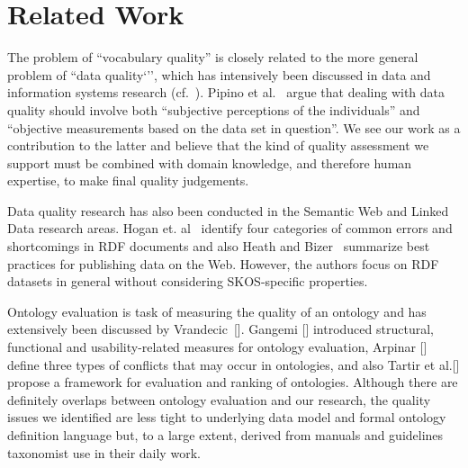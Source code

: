 \section{Related Work}\label{sec:related_work}


The problem of ``vocabulary quality'' is closely related to the more general problem of ``data quality`'', which has intensively been discussed in data and information systems research (cf.~\cite{Batini2009}). Pipino et al.~\cite{Pipino2002} argue that dealing with data quality should involve both ``subjective perceptions of the individuals'' and ``objective measurements based on the data set in question''. We see our work as a contribution to the latter and believe that the kind of quality assessment we support must be combined with domain knowledge, and therefore human expertise, to make final quality judgements.


Data quality research has also been conducted in the Semantic Web and Linked Data research areas. Hogan et. al~\cite{Hogan2010} identify four categories of common errors and shortcomings in RDF documents and also Heath and Bizer~\cite{Heath2011} summarize best practices for publishing data on the Web. However, the authors focus on RDF datasets in general without considering SKOS-specific properties. 


Ontology evaluation is task of measuring the quality of an ontology and has extensively been discussed by Vrandecic~[]. Gangemi [] introduced structural, functional and usability-related measures for ontology evaluation, Arpinar [] define three types of conflicts that may occur in ontologies, and also Tartir et al.[] propose a framework for evaluation and ranking of ontologies. Although there are definitely overlaps between ontology evaluation and our research, the quality issues we identified are less tight to underlying data model and formal ontology definition language but, to a large extent, derived from manuals and guidelines taxonomist use in their daily work.